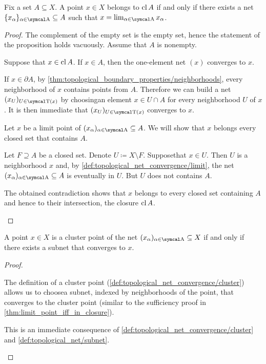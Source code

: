 \begin{proposition}\label{thm:limit_point_iff_in_closure}\cite[proposition 1.6.3]{Engelking1989}
  Fix a set \( A \subseteq X \). A point \( x \in X \) belongs to \( \operatorname{cl}{A} \) if and only if there exists a net \( \{ x_\al \}_{\al \in \CA} \subseteq A \) such that \( x = \lim_{\al \in \CA} x_\al \).
\end{proposition}
\begin{proof}
  The complement of the empty set is the empty set, hence the statement of the proposition holds vacuously. Assume that \( A \) is nonempty.

  \begin{description}
    \Implies Suppose that \( x \in \operatorname{cl}{A} \). If \( x \in A \), then the one-element net \( (x) \) converges to \( x \).

    If \( x \in \partial{A} \), by \cref{thm:topological_boundary_properties/neighborhoods}, every neighborhood of \( x \) contains points from \( A \). Therefore we can build a net \( (x_U)_{U \in \CT(x)} \) by choosing\AOC an element \( x \in U \cap A \) for every neighborhood \( U \) of \( x \). It is then immediate that \( (x_U)_{U \in \CT(x)} \) converges to \( x \).

    \ImpliedBy Let \( x \) be a limit point of \( (x_\al)_{\al \in \CA} \subseteq A \). We will show that \( x \) belongs every closed set that contains \( A \).

    Let \( F \supseteq A \) be a closed set. Denote \( U \coloneqq X \setminus F \). Suppose\LEM that \( x \in U \). Then \( U \) is a neighborhood \( x \) and, by \cref{def:topological_net_convergence/limit}, the net \( (x_\al)_{\al \in \CA} \subseteq A \) is eventually in \( U \). But \( U \) does not contains \( A \).

    The obtained contradiction shows that \( x \) belongs to every closed set containing \( A \) and hence to their intersection, the closure \( \operatorname{cl} A \).
  \end{description}
\end{proof}

\begin{proposition}\label{thm:cluster_point_iff_in_subsequence_limit}
  A point \( x \in X \) is a cluster point of the net \( (x_\al)_{\al \in \CA} \subseteq X \) if and only if there exists a subnet that converges to \( x \).
\end{proposition}
\begin{proof}
  \begin{description}
    \Implies The definition of a cluster point (\cref{def:topological_net_convergence/cluster}) allows us to choose\AOC a subnet, indexed by neighborhoods of the point, that converges to the cluster point (similar to the sufficiency proof in \cref{thm:limit_point_iff_in_closure}).

    \ImpliedBy This is an immediate consequence of \cref{def:topological_net_convergence/cluster} and \cref{def:topological_net/subnet}.
  \end{description}
\end{proof}
